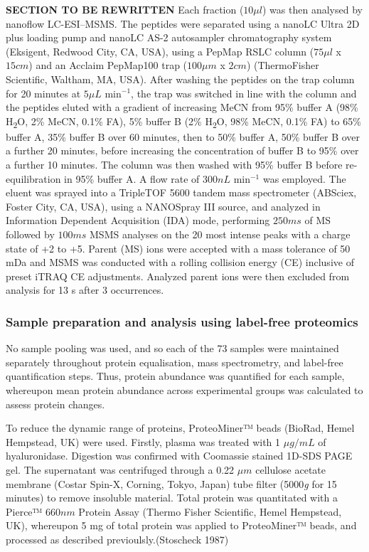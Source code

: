 \documentclass[9pt,lineno]{elife}
\begin{document}
\textbf{SECTION TO BE REWRITTEN}
Each fraction (\(10 \mu l\)) was then analysed by nanoflow LC-ESI--MSMS. The peptides were separated using a nanoLC Ultra 2D plus loading pump and nanoLC AS-2 autosampler chromatography system (Eksigent, Redwood City, CA, USA), using a PepMap RSLC column (\(75\mu l\) x \(15 cm\)) and an Acclaim PepMap100 trap (\(100\mu m\) x \(2 cm\)) (ThermoFisher Scientific, Waltham, MA, USA).
After washing the peptides on the trap column for 20 minutes at \(5\mu L\) min\(^{-1}\), the trap was switched in line with the column and the peptides eluted with a gradient of increasing MeCN from 95\% buffer A (98\% H\textsubscript{2}O, 2\% MeCN, 0.1\% FA), 5\% buffer B (2\% H\textsubscript{2}O, 98\% MeCN, 0.1\% FA) to 65\% buffer A, 35\% buffer B over 60 minutes, then to 50\% buffer A, 50\% buffer B over a further 20 minutes, before increasing the concentration of buffer B to 95\% over a further 10 minutes.
The column was then washed with 95\% buffer B before re-equilibration in 95\% buffer A. A flow rate of \(300 nL\) min\(^{-1}\) was employed. The eluent was sprayed into a TripleTOF 5600 tandem mass spectrometer (ABSciex, Foster City, CA, USA), using a NANOSpray III source, and analyzed in Information Dependent Acquisition (IDA) mode, performing \(250 ms\) of MS followed by \(100 ms\) MSMS analyses on the 20 most intense peaks with a charge state of +2 to +5.
Parent (MS) ions were accepted with a mass tolerance of 50 mDa and MSMS was conducted with a rolling collision energy (CE) inclusive of preset iTRAQ CE adjustments.
Analyzed parent ions were then excluded from analysis for 13 s after 3 occurrences.

\hypertarget{label-free-sample-prep}{%
\subsubsection{Sample preparation and analysis using label-free proteomics}\label{label-free-sample-prep}}

No sample pooling was used, and so each of the 73 samples were maintained separately throughout protein equalisation, mass spectrometry, and label-free quantification steps.
Thus, protein abundance was quantified for each sample, whereupon mean protein abundance across experimental groups was calculated to assess protein changes.

To reduce the dynamic range of proteins, ProteoMiner™ beads (BioRad, Hemel Hempstead, UK) were used. Firstly, plasma was treated with 1 \(\mu g/mL\) of hyaluronidase. Digestion was confirmed with Coomassie stained 1D-SDS PAGE gel.
The supernatant was centrifuged through a 0.22 \(\mu m\) cellulose acetate membrane (Costar Spin-X, Corning, Tokyo, Japan) tube filter (5000\emph{g} for 15 minutes) to remove insoluble material.
Total protein was quantitated with a Pierce™ \(660 nm\) Protein Assay (Thermo Fisher Scientific, Hemel Hempstead, UK), whereupon 5 mg of total protein was applied to ProteoMiner™ beads, and processed as described previoulsly.(Stoscheck 1987)
\end{document}
